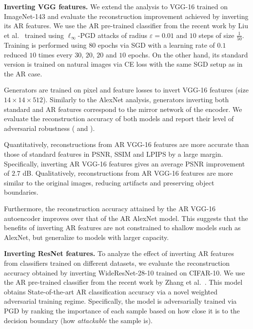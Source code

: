 \textbf{Inverting VGG features.} We extend the analysis to VGG-16 trained on ImageNet-143 and evaluate the reconstruction improvement achieved by inverting its AR features. We use the AR pre-trained classifier from the recent work by Liu et al.~\cite{liu_2018_adv} trained using $\ell_{\infty}$-PGD attacks of radius $\varepsilon=0.01$ and $10$ steps of size $\frac{1}{50}$. Training is performed using $80$ epochs via SGD with a learning rate of $0.1$ reduced $10$ times every $30$, $20$, $20$ and $10$ epochs. On the other hand, its standard version is trained on natural images via CE loss with the same SGD setup as in the AR case.

Generators are trained on pixel and feature losses to invert VGG-16  features (size $14 \times 14 \times 512$). Similarly to the AlexNet analysis, generators inverting both standard and AR features correspond to the mirror network of the encoder. We evaluate the reconstruction accuracy of both models and report their level of adversarial robustness ( and ).



Quantitatively, reconstructions from AR VGG-16 features are more accurate than those of standard features in PSNR, SSIM and LPIPS by a large margin. Specifically, inverting AR VGG-16 features gives an average PSNR improvement of $2.7$ dB. Qualitatively, reconstructions from AR VGG-16 features are more similar to the original images, reducing artifacts and preserving object boundaries.

Furthermore, the reconstruction accuracy attained by the AR VGG-16 autoencoder improves over that of the AR AlexNet model. This suggests that the benefits of inverting AR features are not constrained to shallow models such as AlexNet, but generalize to models with larger capacity.

\textbf{Inverting ResNet features.} To analyze the effect of inverting AR features from classifiers trained on different datasets, we evaluate the reconstruction accuracy obtained by inverting WideResNet-28-10 trained on CIFAR-10. We use the AR pre-trained classifier from the recent work by Zhang et al.~\cite{zhang_2020_geometry}. This model obtains State-of-the-art AR classification accuracy via a novel weighted adversarial training regime. Specifically, the model is adversarially trained via PGD by ranking the importance of each sample based on how close it is to the decision boundary (how \textit{attackable} the sample is).

